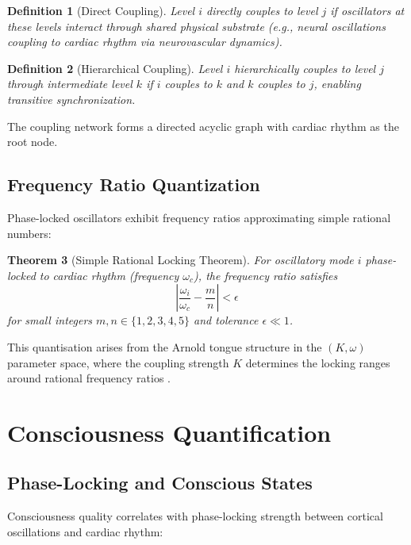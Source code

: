 \documentclass[12pt]{article}
\newtheorem{theorem}{Theorem}[section]
\newtheorem{definition}[theorem]{Definition}
\theoremstyle{remark}
\begin{document}
\begin{definition}[Direct Coupling]
Level $i$ directly couples to level $j$ if oscillators at these levels interact through shared physical substrate (e.g., neural oscillations coupling to cardiac rhythm via neurovascular dynamics).
\end{definition}

\begin{definition}[Hierarchical Coupling]
Level $i$ hierarchically couples to level $j$ through intermediate level $k$ if $i$ couples to $k$ and $k$ couples to $j$, enabling transitive synchronization.
\end{definition}

The coupling network forms a directed acyclic graph with cardiac rhythm as the root node.

\subsection{Frequency Ratio Quantization}

Phase-locked oscillators exhibit frequency ratios approximating simple rational numbers:

\begin{theorem}[Simple Rational Locking Theorem]
For oscillatory mode $i$ phase-locked to cardiac rhythm (frequency $\omega_c$), the frequency ratio satisfies
\begin{equation}
\left|\frac{\omega_i}{\omega_c} - \frac{m}{n}\right| < \epsilon
\end{equation}
for small integers $m, n \in \{1, 2, 3, 4, 5\}$ and tolerance $\epsilon \ll 1$.
\end{theorem}

This quantisation arises from the Arnold tongue structure in the $(K, \omega)$ parameter space, where the coupling strength $K$ determines the locking ranges around rational frequency ratios \citep{jensen1984complete}.

\section{Consciousness Quantification}

\subsection{Phase-Locking and Conscious States}

Consciousness quality correlates with phase-locking strength between cortical oscillations and cardiac rhythm:
\end{document}
